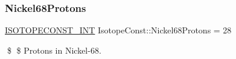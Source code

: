 \subsubsection{\texorpdfstring{Nickel68\+Protons}{Nickel68Protons}}
{\footnotesize\ttfamily \mbox{\hyperlink{group___isotope_const-_macros_ga5f18360b3e99483a35c32d789e62621c}{I\+S\+O\+T\+O\+P\+E\+C\+O\+N\+S\+T\+\_\+\+I\+NT}} Isotope\+Const\+::\+Nickel68\+Protons = 28}

\$ \$ Protons in Nickel-\/68. 